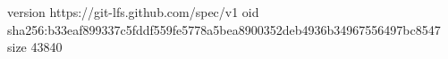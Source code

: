 version https://git-lfs.github.com/spec/v1
oid sha256:b33eaf899337c5fddf559fe5778a5bea8900352deb4936b34967556497bc8547
size 43840
